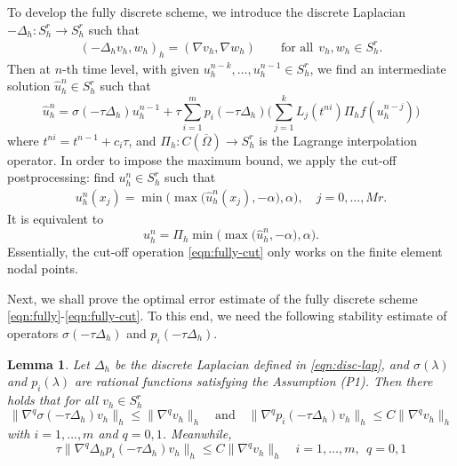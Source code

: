 \documentclass[a4paper, oneside]{book}
\newtheorem{lemma}{Lemma}[section]
\begin{document}
To develop the fully discrete scheme, we introduce the discrete Laplacian $-\Delta_h: S_h^r\rightarrow S_h^r$ such that
\begin{align}\label{eqn:disc-lap}
(-\Delta_h v_h, w_h)_h = (\nabla v_h, \nabla w_h)\qquad \text{for all} ~~v_h,w_h\in S_h^r.
\end{align}
Then at $n$-th time level, with given $u_h^{n-k}, \ldots, u_h^{n-1} \in S_h^r$, we find an intermediate solution
$\hat u_h^n\in S_h^r$ such that
\begin{equation}\label{eqn:fully}
 \hat u_h^n = \sigma(-\tau \Delta_h) u_h^{n-1} +\tau  \sum_{i=1}^m p_i(-\tau \Delta_h)
 \Big(\sum_{j=1}^{k} L_j (t^{ni}) \Pi_h f(u_h^{n-j})\Big)
\end{equation}
where $t^{ni}=t^{n-1}+c_i\tau$, and $\Pi_h:C(\overline\Omega)\rightarrow S_h^r$ is the Lagrange interpolation operator.
In order to impose the maximum bound, we apply the cut-off postprocessing: find $u_h^n \in S_h^r$ such that
\begin{equation}\label{eqn:fully-cut}
\begin{split}
u_h^n(x_j)  = \min\big(\max \big(\hat u_h^n(x_j), - \alpha \big) , \alpha \big),  \quad j=0,\dots,Mr.
\end{split}
\end{equation}
It is equivalent to
\begin{equation*}
u_h^n  = \Pi_h \min\big(\max \big(\hat u_h^n, - \alpha \big) , \alpha \big) .
\end{equation*}
Essentially, the cut-off operation \eqref{eqn:fully-cut} only works on the finite element nodal points.


Next, we shall prove the optimal error estimate of the fully discrete scheme \eqref{eqn:fully}-\eqref{eqn:fully-cut}.
To this end, we need the following stability estimate of operators $\sigma(-\tau \Delta_h)$ and $p_i(-\tau \Delta_h) $.
\begin{lemma}\label{lem:stable-fully}
Let $\Delta_h$ be the discrete Laplacian defined in \eqref{eqn:disc-lap}, and $\sigma(\lambda)$ and $p_i(\lambda)$ are
rational functions satisfying the Assumption (P1). Then there holds that for all $v_h \in S_h^r$
\begin{equation}\label{eqn:stab-est-1}
 \|  \nabla^q \sigma(-\tau \Delta_h) v_h \|_h \le \| \nabla^q v_h \|_h
\quad \text{and}\quad \|  \nabla^q p_i(-\tau \Delta_h ) v_h \|_h \le C\| \nabla^q v_h \|_h
 \end{equation}
 with $i=1,\ldots,m$ and $q=0,1$.
 Meanwhile,
\begin{equation} \label{eqn:stab-est-2}
 \tau \|  \nabla^q \Delta_h p_i (-\tau \Delta_h) v_h \|_h   \le C \|  \nabla^q v_h \|_h
 \quad  i=1,\ldots,m, ~~q=0,1
  \end{equation}
\end{lemma}
\end{document}

